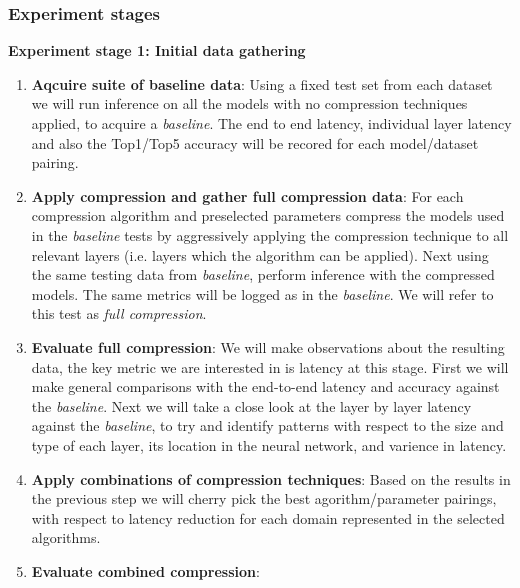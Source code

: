\documentclass[../../D1.tex]{subfiles}
\begin{document}
\subsubsection{Experiment stages}
\textbf{Experiment stage 1: Initial data gathering}
\begin{enumerate}
    \item \textbf{Aqcuire suite of baseline data}: Using a fixed test set from each dataset we will run inference on all the models with no compression techniques applied, to acquire a \emph{baseline}. The end to end latency, individual layer latency and also the Top1/Top5 accuracy will be recored for each model/dataset pairing.
    \item \textbf{Apply compression and gather full compression data}: For each compression algorithm and preselected parameters compress the models used in the \emph{baseline} tests by aggressively applying the compression technique to all relevant layers (i.e. layers which the algorithm can be applied). Next using the same testing data from \emph{baseline}, perform inference with the compressed models. The same metrics will be logged as in the \emph{baseline}. We will refer to this test as \emph{full compression}.
    \item \textbf{Evaluate full compression}: We will make observations about the resulting data, the key metric we are interested in is latency at this stage. First we will make general comparisons with the end-to-end latency and accuracy against the \emph{baseline}. Next we will take a close look at the layer by layer latency against the \emph{baseline}, to try and identify patterns with respect to the size and type of each layer, its location in the neural network, and varience in latency. 
    \item \textbf{Apply combinations of compression techniques}: Based on the results in the previous step we will cherry pick the best agorithm/parameter pairings, with respect to latency reduction for each domain represented in the selected algorithms. 
    \item \textbf{Evaluate combined compression}:
\end{enumerate}
\end{document}
